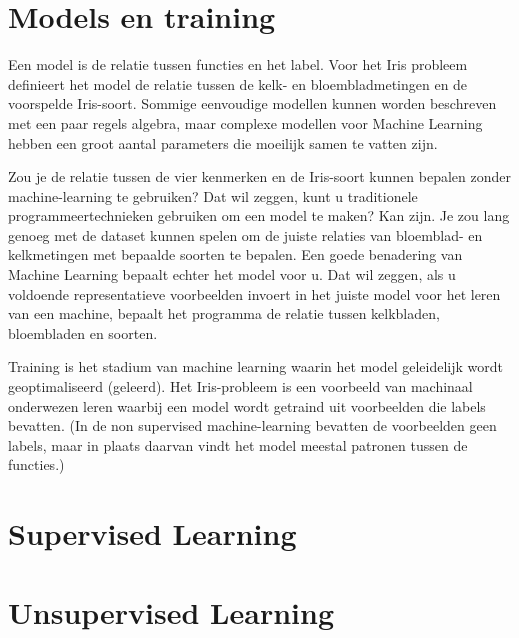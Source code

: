 \section{Models en training}
Een model is de relatie tussen functies en het label. Voor het Iris probleem definieert het model de relatie tussen de kelk- en bloembladmetingen en de voorspelde Iris-soort. Sommige eenvoudige modellen kunnen worden beschreven met een paar regels algebra, maar complexe modellen voor Machine Learning hebben een groot aantal parameters die moeilijk samen te vatten zijn. 

Zou je de relatie tussen de vier kenmerken en de Iris-soort kunnen bepalen zonder machine-learning te gebruiken? Dat wil zeggen, kunt u traditionele programmeertechnieken gebruiken om een model te maken? Kan zijn. Je zou lang genoeg met de dataset kunnen spelen om de juiste relaties van bloemblad- en kelkmetingen met bepaalde soorten te bepalen. Een goede benadering van Machine Learning bepaalt echter het model voor u. Dat wil zeggen, als u voldoende representatieve voorbeelden invoert in het juiste model voor het leren van een machine, bepaalt het programma de relatie tussen kelkbladen, bloembladen en soorten.

Training is het stadium van machine learning waarin het model geleidelijk wordt geoptimaliseerd (geleerd). Het Iris-probleem is een voorbeeld van machinaal onderwezen leren waarbij een model wordt getraind uit voorbeelden die labels bevatten. (In de non supervised machine-learning bevatten de voorbeelden geen labels, maar in plaats daarvan vindt het model meestal patronen tussen de functies.)

\section{Supervised Learning}

\section{Unsupervised Learning}






